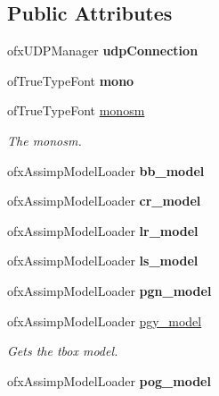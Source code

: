 \subsection*{Public Attributes}
\begin{DoxyCompactItemize}
\item 
\hypertarget{classtest_app_a30c39505591fda7ed8ef4d8c4f0128fd}{ofx\-U\-D\-P\-Manager {\bfseries udp\-Connection}}\label{classtest_app_a30c39505591fda7ed8ef4d8c4f0128fd}

\item 
\hypertarget{classtest_app_a9bcefa3afb830941451f72174a36b722}{of\-True\-Type\-Font {\bfseries mono}}\label{classtest_app_a9bcefa3afb830941451f72174a36b722}

\item 
\hypertarget{classtest_app_afc42ad25d37b1292d27d783380249424}{of\-True\-Type\-Font \hyperlink{classtest_app_afc42ad25d37b1292d27d783380249424}{monosm}}\label{classtest_app_afc42ad25d37b1292d27d783380249424}

\begin{DoxyCompactList}\small\item\em The monosm. \end{DoxyCompactList}\item 
\hypertarget{classtest_app_a55051db1203331adb5556373b1f93194}{ofx\-Assimp\-Model\-Loader {\bfseries bb\-\_\-model}}\label{classtest_app_a55051db1203331adb5556373b1f93194}

\item 
\hypertarget{classtest_app_a0226f29cac900da4a7d1a698b1b5b9d3}{ofx\-Assimp\-Model\-Loader {\bfseries cr\-\_\-model}}\label{classtest_app_a0226f29cac900da4a7d1a698b1b5b9d3}

\item 
\hypertarget{classtest_app_a75d1f2c61d9e27b0f639a2632de94ed0}{ofx\-Assimp\-Model\-Loader {\bfseries lr\-\_\-model}}\label{classtest_app_a75d1f2c61d9e27b0f639a2632de94ed0}

\item 
\hypertarget{classtest_app_ab7fc48fde55ff01601e7ec704685fda7}{ofx\-Assimp\-Model\-Loader {\bfseries ls\-\_\-model}}\label{classtest_app_ab7fc48fde55ff01601e7ec704685fda7}

\item 
\hypertarget{classtest_app_a80f171a105bccdb3e505d438462d089a}{ofx\-Assimp\-Model\-Loader {\bfseries pgn\-\_\-model}}\label{classtest_app_a80f171a105bccdb3e505d438462d089a}

\item 
ofx\-Assimp\-Model\-Loader \hyperlink{classtest_app_ae4ab187191426de0728985d0789acf88}{pgy\-\_\-model}
\begin{DoxyCompactList}\small\item\em Gets the tbox model. \end{DoxyCompactList}\item 
\hypertarget{classtest_app_a28a2622b1304d4096d4fefc1a46759b3}{ofx\-Assimp\-Model\-Loader {\bfseries pog\-\_\-model}}\label{classtest_app_a28a2622b1304d4096d4fefc1a46759b3}


\end{DoxyCompactItemize}
